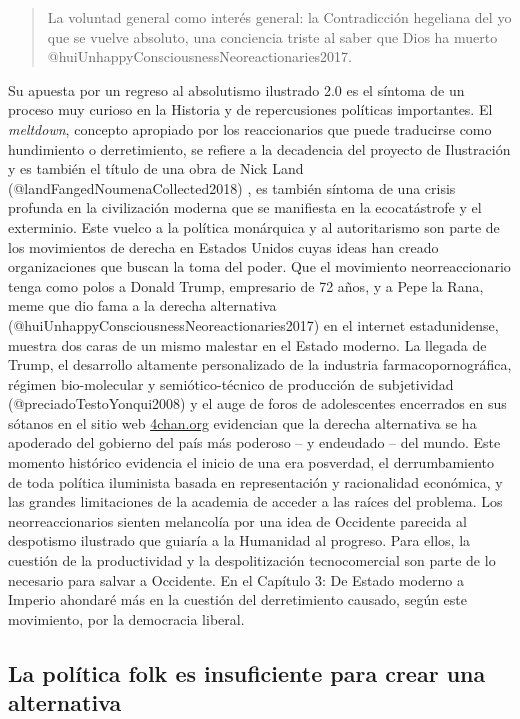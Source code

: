 \documentclass[
]{article}
\begin{document}
\begin{quote}
La voluntad general como interés general: la Contradicción hegeliana del
yo que se vuelve absoluto, una conciencia triste al saber que Dios ha
muerto @huiUnhappyConsciousnessNeoreactionaries2017.
\end{quote}

Su apuesta por un regreso al absolutismo ilustrado 2.0 es el síntoma de
un proceso muy curioso en la Historia y de repercusiones políticas
importantes. El \emph{meltdown}, concepto apropiado por los
reaccionarios que puede traducirse como hundimiento o derretimiento, se
refiere a la decadencia del proyecto de Ilustración y es también el
título de una obra de Nick Land (@landFangedNoumenaCollected2018) , es
también síntoma de una crisis profunda en la civilización moderna que se
manifiesta en la ecocatástrofe y el exterminio. Este vuelco a la
política monárquica y al autoritarismo son parte de los movimientos de
derecha en Estados Unidos cuyas ideas han creado organizaciones que
buscan la toma del poder. Que el movimiento neorreaccionario tenga como
polos a Donald Trump, empresario de 72 años, y a Pepe la Rana, meme que
dio fama a la derecha alternativa
(@huiUnhappyConsciousnessNeoreactionaries2017) en el internet
estadunidense, muestra dos caras de un mismo malestar en el Estado
moderno. La llegada de Trump, el desarrollo altamente personalizado de
la industria farmacopornográfica, régimen bio-molecular y
semiótico-técnico de producción de subjetividad
(@preciadoTestoYonqui2008) y el auge de foros de adolescentes encerrados
en sus sótanos en el sitio web \url{4chan.org} evidencian que la derecha
alternativa se ha apoderado del gobierno del país más poderoso -- y
endeudado -- del mundo. Este momento histórico evidencia el inicio de
una era posverdad, el derrumbamiento de toda política iluminista basada
en representación y racionalidad económica, y las grandes limitaciones
de la academia de acceder a las raíces del problema. Los
neorreaccionarios sienten melancolía por una idea de Occidente parecida
al despotismo ilustrado que guiaría a la Humanidad al progreso. Para
ellos, la cuestión de la productividad y la despolitización
tecnocomercial son parte de lo necesario para salvar a Occidente. En el
Capítulo 3: De Estado moderno a Imperio ahondaré más en la cuestión del
derretimiento causado, según este movimiento, por la democracia liberal.

\hypertarget{la-poluxedtica-folk-es-insuficiente-para-crear-una-alternativa}{%
\subsection{La política folk es insuficiente para crear una
alternativa}\label{la-poluxedtica-folk-es-insuficiente-para-crear-una-alternativa}}
\end{document}
